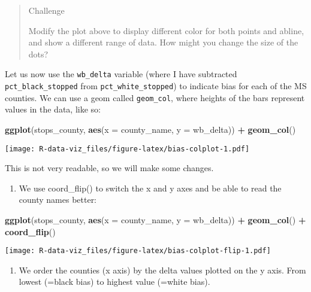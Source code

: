 \documentclass[]{book}
\newenvironment{Shaded}{\begin{snugshade}}{\end{snugshade}}
\newcommand{\DataTypeTok}[1]{\textcolor[rgb]{0.13,0.29,0.53}{#1}}
\newcommand{\KeywordTok}[1]{\textcolor[rgb]{0.13,0.29,0.53}{\textbf{#1}}}
\newcommand{\NormalTok}[1]{#1}
\newcommand{\OperatorTok}[1]{\textcolor[rgb]{0.81,0.36,0.00}{\textbf{#1}}}
\newcommand{\StringTok}[1]{\textcolor[rgb]{0.31,0.60,0.02}{#1}}
\providecommand{\tightlist}{%
  \setlength{\itemsep}{0pt}\setlength{\parskip}{0pt}}
\begin{document}
\begin{quote}
Challenge

Modify the plot above to display different color for both points and abline, and show a different range of data. How might you change the size of the dots?
\end{quote}

Let us now use the \texttt{wb\_delta} variable (where I have subtracted \texttt{pct\_black\_stopped} from \texttt{pct\_white\_stopped}) to indicate bias for each of the MS counties. We can use a geom called \texttt{geom\_col}, where heights of the bars represent values in the data, like so:

\begin{Shaded}
\begin{Highlighting}[]
\KeywordTok{ggplot}\NormalTok{(stops_county, }\KeywordTok{aes}\NormalTok{(}\DataTypeTok{x =}\NormalTok{ county_name, }\DataTypeTok{y =}\NormalTok{ wb_delta)) }\OperatorTok{+}\StringTok{ }
\StringTok{  }\KeywordTok{geom_col}\NormalTok{()}
\end{Highlighting}
\end{Shaded}

\texttt{[image: R-data-viz\_files/figure-latex/bias-colplot-1.pdf]}

This is not very readable, so we will make some changes.

\begin{enumerate}
\def\labelenumi{\arabic{enumi}.}
\tightlist
\item
  We use coord\_flip() to switch the x and y axes and be able to read the county names better:
\end{enumerate}

\begin{Shaded}
\begin{Highlighting}[]
\KeywordTok{ggplot}\NormalTok{(stops_county, }\KeywordTok{aes}\NormalTok{(}\DataTypeTok{x =}\NormalTok{ county_name, }\DataTypeTok{y =}\NormalTok{ wb_delta)) }\OperatorTok{+}
\StringTok{  }\KeywordTok{geom_col}\NormalTok{() }\OperatorTok{+}\StringTok{ }
\StringTok{  }\KeywordTok{coord_flip}\NormalTok{()}
\end{Highlighting}
\end{Shaded}

\texttt{[image: R-data-viz\_files/figure-latex/bias-colplot-flip-1.pdf]}

\begin{enumerate}
\def\labelenumi{\arabic{enumi}.}
\setcounter{enumi}{1}
\tightlist
\item
  We order the counties (x axis) by the delta values plotted on the y axis. From lowest (=black bias) to highest value (=white bias).
\end{enumerate}
\end{document}
